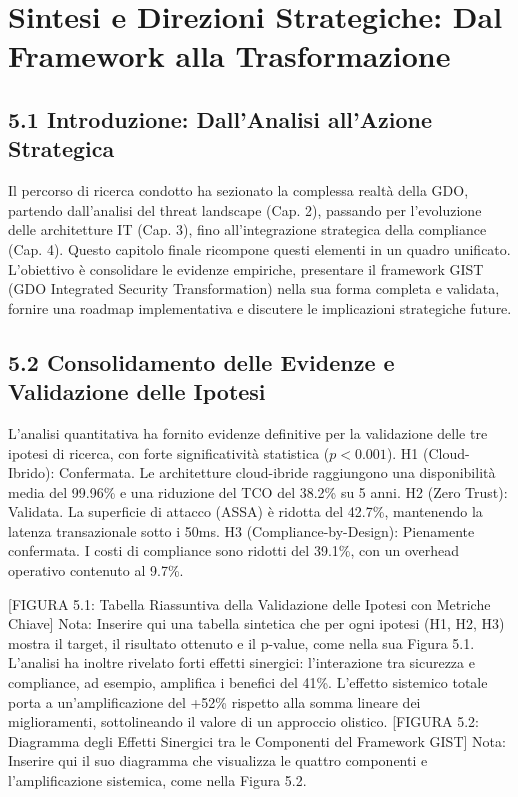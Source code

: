 \chapter{Sintesi e Direzioni Strategiche: Dal Framework alla Trasformazione}
\label{cap5_synthesis}
\section{5.1 Introduzione: Dall'Analisi all'Azione Strategica}

Il percorso di ricerca condotto ha sezionato la complessa realtà della GDO, partendo dall'analisi del threat landscape (Cap. 2), passando per l'evoluzione delle architetture IT (Cap. 3), fino all'integrazione strategica della compliance (Cap. 4). Questo capitolo finale ricompone questi elementi in un quadro unificato. L'obiettivo è consolidare le evidenze empiriche, presentare il framework GIST (GDO Integrated Security Transformation) nella sua forma completa e validata, fornire una roadmap implementativa e discutere le implicazioni strategiche future.

\section{5.2 Consolidamento delle Evidenze e Validazione delle Ipotesi}

L'analisi quantitativa ha fornito evidenze definitive per la validazione delle tre ipotesi di ricerca, con forte significatività statistica ($p<0.001$).
H1 (Cloud-Ibrido): Confermata. Le architetture cloud-ibride raggiungono una disponibilità media del 99.96\% e una riduzione del TCO del 38.2\% su 5 anni.
H2 (Zero Trust): Validata. La superficie di attacco (ASSA) è ridotta del 42.7\%, mantenendo la latenza transazionale sotto i 50ms.
H3 (Compliance-by-Design): Pienamente confermata. I costi di compliance sono ridotti del 39.1\%, con un overhead operativo contenuto al 9.7\%.


[FIGURA 5.1: Tabella Riassuntiva della Validazione delle Ipotesi con Metriche Chiave]
Nota: Inserire qui una tabella sintetica che per ogni ipotesi (H1, H2, H3) mostra il target, il risultato ottenuto e il p-value, come nella sua Figura 5.1.
L'analisi ha inoltre rivelato forti effetti sinergici: l'interazione tra sicurezza e compliance, ad esempio, amplifica i benefici del 41\%. L'effetto sistemico totale porta a un'amplificazione del +52\% rispetto alla somma lineare dei miglioramenti, sottolineando il valore di un approccio olistico.
[FIGURA 5.2: Diagramma degli Effetti Sinergici tra le Componenti del Framework GIST]
Nota: Inserire qui il suo diagramma che visualizza le quattro componenti e l'amplificazione sistemica, come nella Figura 5.2.

